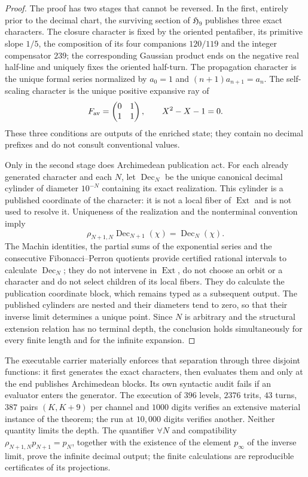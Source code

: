 \begin{proof}
The proof has two stages that cannot be reversed. In the first, entirely
prior to the decimal chart, the surviving section of
\(\mathfrak H_9\) publishes three exact characters. The closure character
is fixed by the oriented pentafiber, its primitive slope \(1/5\), the
composition of its four companions \(120/119\) and the integer compensator
\(239\); the corresponding Gaussian product ends on the negative real
half-line and uniquely fixes the oriented half-turn. The propagation
character is the unique formal series normalized by
\(a_0=1\) and \((n+1)a_{n+1}=a_n\). The self-scaling character is the unique positive
expansive ray of
\[
 F_{\rm av}=\begin{pmatrix}0&1\\1&1\end{pmatrix},
 \qquad X^2-X-1=0.
\]
These three conditions are outputs of the enriched state; they contain no
decimal prefixes and do not consult conventional values.

Only in the second stage does Archimedean publication act. For each already generated
character and each \(N\), let \(\operatorname{Dec}_N\) be the unique canonical decimal
cylinder of diameter \(10^{-N}\) containing its exact realization.
This cylinder is a published coordinate of the character: it is not a local fiber
of \(\operatorname{Ext}\) and is not used to resolve it.
Uniqueness of the realization and the nonterminal convention imply
\[
 \rho_{N+1,N}\operatorname{Dec}_{N+1}(\chi)
 =\operatorname{Dec}_N(\chi).
\]
The Machin identities, the partial sums of the exponential series and the
consecutive Fibonacci--Perron quotients provide certified rational intervals
to calculate \(\operatorname{Dec}_N\); they do not intervene in
\(\operatorname{Ext}\), do not choose an orbit or a character and do not select
children of its local fibers. They do calculate the publication coordinate block,
which remains typed as a subsequent output. The
published cylinders are nested and their diameters tend to zero, so
that their inverse limit determines a unique point. Since \(N\) is arbitrary and
the structural extension relation has no terminal depth, the
conclusion holds simultaneously for every finite length and for the infinite
expansion.
\end{proof}

The executable carrier materially enforces that separation through three
disjoint functions: it first generates the exact characters, then evaluates them
and only at the end publishes Archimedean blocks. Its own syntactic audit
fails if an evaluator enters the generator. The execution of \(396\) levels,
\(2376\) trits, \(43\) turns, \(387\) pairs \((K,K+9)\) per channel and
\(1000\) digits verifies an extensive material instance of the theorem; the run at
\(10,000\) digits verifies another. Neither quantity limits the
depth. The quantifier \(\forall N\) and compatibility
\(\rho_{N+1,N}p_{N+1}=p_N\), together with the existence of the element
\(p_\infty\) of the inverse limit, prove the infinite decimal output; the
finite calculations are reproducible certificates of its projections.

